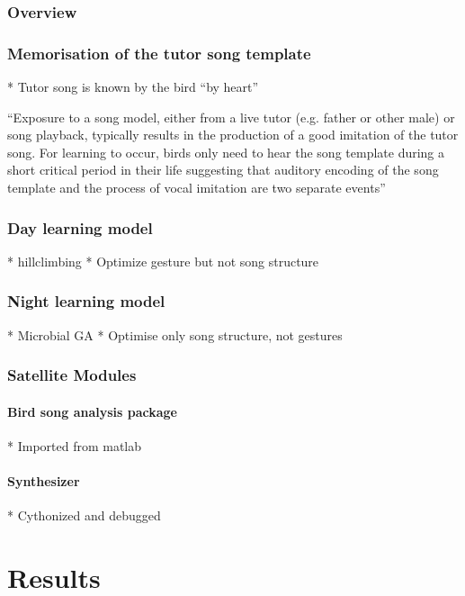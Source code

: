 \documentclass{report}
\begin{document}
\subsection{Overview}

\subsection{Memorisation of the tutor song template}

* Tutor song is known by the bird ``by heart''

\parencite{deregnaucourt_how_2005, margoliash_sleep_2010} ``Exposure to a song
model, either from a live tutor (e.g. father or other male) or song playback,
typically results in the production of a good imitation of the tutor song. For
learning to occur, birds only need to hear the song template during a short
critical period in their life suggesting that auditory encoding of the song
template and the process of vocal imitation are two separate events''

\subsection{Day learning model}

* hillclimbing
* Optimize gesture but not song structure


\subsection{Night learning model}

* Microbial GA
* Optimise only song structure, not gestures

\subsection{Satellite Modules}

\subsubsection{Bird song analysis package}

* Imported from matlab

\subsubsection{Synthesizer}

* Cythonized and debugged

\chapter{Results}
\end{document}
